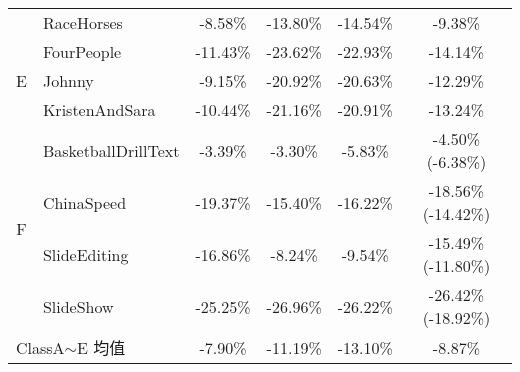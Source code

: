 \begin{table}[!p]
\begin{minipage}{\linewidth}
\begin{tabular}{@{}clcccc@{}}
                                                   & RaceHorses                                & -8.58\%                  & -13.80\% & -14.54\%            & -9.38\%                                                                                                             \\
            \multirow{3}{*}{E}                     & FourPeople                                & -11.43\%                 & -23.62\% & -22.93\%            & -14.14\%                                                                                                            \\
                                                   & Johnny                                    & -9.15\%                  & -20.92\% & -20.63\%            & -12.29\%                                                                                                            \\
                                                   & KristenAndSara                            & -10.44\%                 & -21.16\% & -20.91\%            & -13.24\%                                                                                                            \\
            \multirow{4}{*}{F}                     & BasketballDrillText                       & -3.39\%                  & -3.30\%  & -5.83\%             & -4.50\% (-6.38\%)                                                                                                   \\
                                                   & ChinaSpeed                                & -19.37\%                 & -15.40\% & -16.22\%            & -18.56\% (-14.42\%)                                                                                                 \\
                                                   & SlideEditing                              & -16.86\%                 & -8.24\%  & -9.54\%             & -15.49\% (-11.80\%)                                                                                                 \\
                                                   & SlideShow                                 & -25.25\%                 & -26.96\% & -26.22\%            & -26.42\% (-18.92\%)                                                                                                 \\ \midrule
            \multicolumn{2}{l}{ClassA$\sim$E 均值} & -7.90\%                                   & -11.19\%                 & -13.10\% & -8.87\%                                                                                                                                   \\ \midrule

\end{tabular}
\end{minipage}
\end{table}
